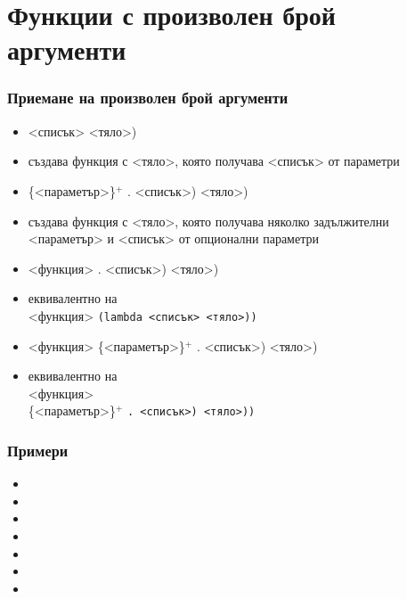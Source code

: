 \documentclass{beamer}
\begin{document}
\section{Функции с произволен брой аргументи}

\begin{frame}
  \frametitle{Приемане на произволен брой аргументи}

  \begin{itemize}[<+->]
  \item {}<списък> <тяло>\tta)
  \item създава функция с <тяло>, която получава <списък> от параметри
  \item {}\{<параметър>\}$^+$ \tta. <списък>\tta) <тяло>\tta)
  \item създава функция с <тяло>, която получава няколко задължителни <параметър> и <списък> от опционални параметри
  \item {}<функция> \tta. <списък>\tta) <тяло>\tta)
  \item еквивалентно на \\
     <функция> \tt{(lambda }<списък> <тяло>\tt{))}
  \item {}<функция> \{<параметър>\}$^+$ \tta. <списък>\tta) <тяло>\tta)
  \item еквивалентно на \\
     <функция>\\
    \hspace{10ex}\{<параметър>\}$^+$ \tt. <списък>\tt) <тяло>\tt{))}
  \end{itemize}
\end{frame}

\begin{frame}
  \frametitle{Примери}

  \begin{itemize}[<+->]
  \item {}
  \item {}
  \item {}
  \item {}
  \item {}
  \item {}
  \item {}
  \end{itemize}
\end{frame}
\end{document}
